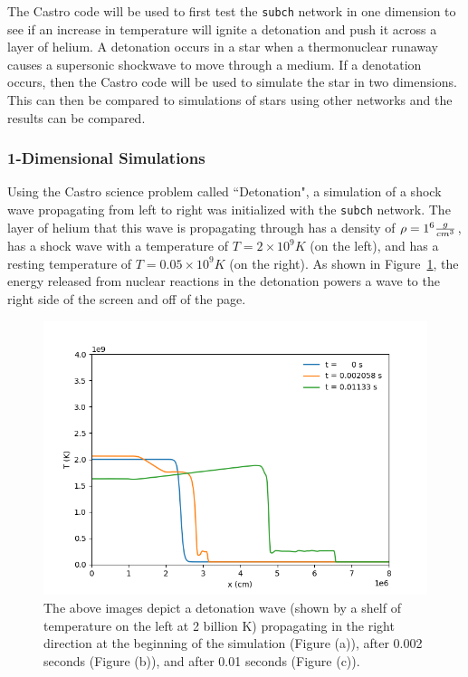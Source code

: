 \documentclass[preprint]{aastex62}
\begin{document}
    The Castro code will be used to first test the {\tt subch} network in one dimension to see if an increase in temperature will ignite a detonation and push it across a layer of helium. A detonation occurs in a star when a thermonuclear runaway causes a supersonic shockwave to move through a medium. If a denotation occurs, then the Castro code will be used to simulate the star in two dimensions. This can then be compared to simulations of stars using other networks and the results can be compared. 
    
    \subsubsection{1-Dimensional Simulations}
    
      Using the Castro science problem called ``Detonation", a simulation of a shock wave propagating from left to right was initialized with the {\tt subch} network. The layer of helium that this wave is propagating through has a density of $\rho = 1 \time 10^6 \frac{g}{cm^3}$, has a shock wave with a temperature of $T = 2 \times 10^9 K$ (on the left), and has a resting temperature of $T = 0.05 \times 10^9 K$ (on the right). As shown in Figure~\ref{fig:detonation}, the energy released from nuclear reactions in the detonation powers a wave to the right side of the screen and off of the page. 
      
    \begin{figure}
      \centering
      \includegraphics[width=5in]{images/flame-thesis}
      \caption{The above images depict a detonation wave (shown by a shelf of temperature on the left at 2 billion K) propagating in the right direction at the beginning of the simulation (Figure (a)), after 0.002 seconds (Figure (b)), and after 0.01 seconds (Figure (c)).}
      \label{fig:detonation}
    \end{figure}
      
\end{document}
